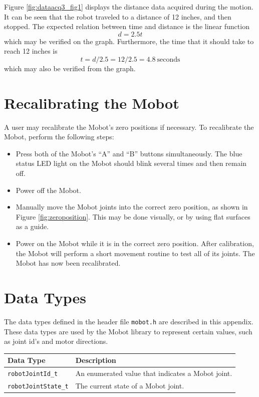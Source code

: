 \documentclass{article}
\begin{document}
Figure \ref{fig:dataacq3_fig1} displays the distance data acquired during the motion. It can
be seen that the robot traveled to a distance of 12 inches, and then stopped. The
expected relation between time and distance is the linear function 
\begin{equation*}
d = 2.5t
\end{equation*}
which may be verified on the graph. Furthermore, the time that it should take to reach 
12 inches is 
\begin{equation}
t = d / 2.5 = 12 / 2.5 = 4.8 ~\text{seconds}
\end{equation}
which may also be verified from the graph.

\section{Recalibrating the Mobot}
A user may recalibrate the Mobot's zero positions if necessary. To recalibrate
the Mobot, perform the following steps:
\begin{itemize}
\item Press both of the Mobot's ``A'' and ``B'' buttons simultaneously. The
blue status LED light on the Mobot should blink several times and then remain
off.
\item Power off the Mobot.
\item Manually move the Mobot joints into the correct zero position, as shown in Figure \ref{fig:zeroposition}. This may be
done visually, or by using flat surfaces as a guide.
\item Power on the Mobot while it is in the correct zero position. After calibration,
the Mobot will perform a short movement routine to test all of its joints. The
Mobot has now been recalibrated.
\end{itemize}

\newpage
\appendix
\section{\label{sec:datatypes}Data Types}
The data types defined in the header file \texttt{mobot.h} are described in
this appendix.
These data types are used by the Mobot library to represent 
certain values, such as joint id's and motor directions.

\begin{tabular}{p{3.5cm}p{10cm}} \hline 
Data Type& Description \\
\hline 
\texttt{robotJointId\_t} & An enumerated value that indicates a Mobot joint. \\
\texttt{robotJointState\_t} & The current state of a Mobot joint. \\
\hline
\end{tabular}
\end{document}
